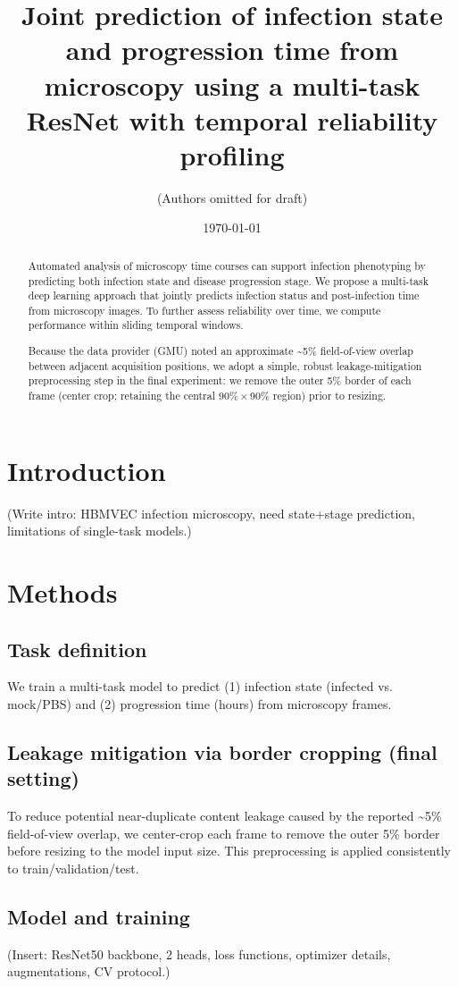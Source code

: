 \documentclass[11pt]{article}
\title{Joint prediction of infection state and progression time from microscopy using a multi-task ResNet with temporal reliability profiling}
\author{(Authors omitted for draft)}
\date{\today}
\begin{document}
\maketitle

\begin{abstract}
Automated analysis of microscopy time courses can support infection phenotyping by predicting both infection state and disease progression stage. We propose a multi-task deep learning approach that jointly predicts infection status and post-infection time from microscopy images. To further assess reliability over time, we compute performance within sliding temporal windows.

Because the data provider (GMU) noted an approximate \textasciitilde5\% field-of-view overlap between adjacent acquisition positions, we adopt a simple, robust leakage-mitigation preprocessing step in the final experiment: we remove the outer 5\% border of each frame (center crop; retaining the central 90\%\,$\times$\,90\% region) prior to resizing.
\end{abstract}

\section{Introduction}
(Write intro: HBMVEC infection microscopy, need state+stage prediction, limitations of single-task models.)

\section{Methods}
\subsection{Task definition}
We train a multi-task model to predict (1) infection state (infected vs. mock/PBS) and (2) progression time (hours) from microscopy frames.

\subsection{Leakage mitigation via border cropping (final setting)}
To reduce potential near-duplicate content leakage caused by the reported \textasciitilde5\% field-of-view overlap, we center-crop each frame to remove the outer 5\% border before resizing to the model input size. This preprocessing is applied consistently to train/validation/test.

\subsection{Model and training}
(Insert: ResNet50 backbone, 2 heads, loss functions, optimizer details, augmentations, CV protocol.)
\end{document}
